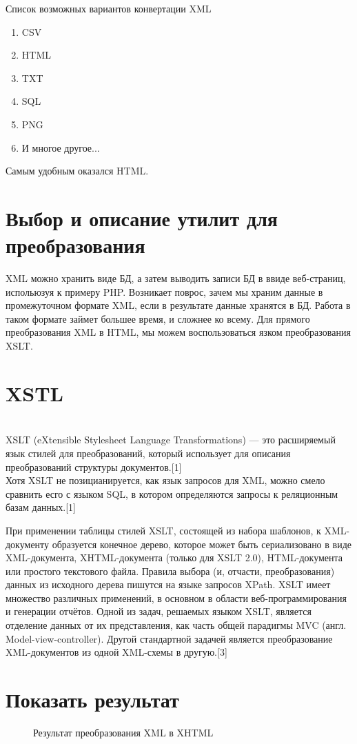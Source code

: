 Список возможных вариантов конвертации XML
\begin{enumerate}
\item CSV
\item HTML
\item TXT
\item SQL
\item PNG
\item И многое другое...
\end{enumerate}
Самым удобным оказался HTML.
\chapter*{Выбор и описание утилит для преобразования}

XML можно хранить виде БД, а затем выводить записи БД в ввиде веб-страниц, испольюзуя к примеру PHP. Возникает поврос, зачем мы храним данные в промежуточном формате XML, если в результате данные хранятся в БД. Работа в таком формате займет большее время, и сложнее ко всему. Для прямого преобразования XML в HTML, мы можем воспользоваться язком преобразования XSLT. 
\chapter*{XSTL}
\\XSLT (eXtensible Stylesheet Language Transformations) — это расширяемый язык стилей для преобразований, который использует для описания преобразований структуры документов.[1]
\\Хотя XSLT не позицианируется, как язык запросов для XML, можно смело сравнить есго с языком SQL, в котором определяются запросы к реляционным базам данных.[1]

При применении таблицы стилей XSLT, состоящей из набора шаблонов, к XML-документу образуется конечное дерево, которое может быть сериализовано в виде XML-документа, XHTML-документа (только для XSLT 2.0), HTML-документа или простого текстового файла. Правила выбора (и, отчасти, преобразования) данных из исходного дерева пишутся на языке запросов XPath.
XSLT имеет множество различных применений, в основном в области веб-программирования и генерации отчётов. Одной из задач, решаемых языком XSLT, является отделение данных от их представления, как часть общей парадигмы MVC (англ. Model-view-controller). Другой стандартной задачей является преобразование XML-документов из одной XML-схемы в другую.[3]
\chapter*{Показать результат}
\begin{figure}[h]
\caption{Результат преобразования XML в XHTML}
\label{pic:xml_to_xslt}
\end{figure}

